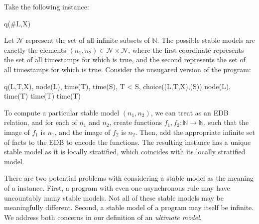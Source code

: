 \begin{example}
Take the following \lang instance:

\begin{Drules}
        {q(#L,X)}
\end{Drules}

Let $\mathcal{N}$ represent the set of all infinite subsets of $\mathbb{N}$.
The possible stable models are exactly the elements $(n_1, n_2) \in \mathcal{N}
\times \mathcal{N}$, where the first coordinate represents the set of all
timestamps for which  is true, and the second represents the
set of all timestamps for which  is true.  Consider the
unsugared version of the program:

\begin{Drules}
        {q(L,T,X), node(L), time(T), time(S), T < S, choice((L,T,X),(S))}
        {node(L), time(T)}
        {time(T)}
        {time(T)}
\end{Drules}

To compute a particular stable model $(n_1,n_2)$, we can treat  as an EDB relation, and for each of $n_1$ and $n_2$, create functions $f_1, f_2 : \mathbb{N} \rightarrow \mathbb{N}$, such that the image of $f_1$ is $n_1$, and the image of $f_2$ is $n_2$.  Then, add the appropriate infinite set of  facts to the EDB to encode the functions.  The resulting instance has a unique stable model as it is locally stratified, which coincides with its locally stratified model.
\end{example}


There are two potential problems with considering a stable model as the meaning of a \lang instance.  
First, a program with even one asynchronous rule may have uncountably many stable models.  
Not all of these stable models may be meaningfully different.  Second, a stable model of a \lang program may itself be infinite.  We address both concerns in our definition of an {\em ultimate model}.

